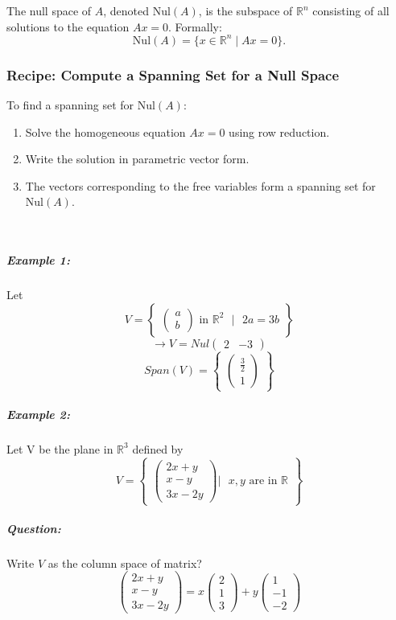 \documentclass[a4paper,12pt]{article}
\begin{document}
\begin{tcolorbox}[title=Definition (Null Space),colframe=blue!70!black, colback=blue!5!white]
The null space of \( A \), denoted \( \text{Nul}(A) \), is the subspace of \( \mathbb{R}^n \) consisting of all solutions to the equation \( A x = 0 \). Formally:
\[
\text{Nul}(A) = \{ x \in \mathbb{R}^n \mid A x = 0 \}.
\]
\end{tcolorbox}

\subsubsection{Recipe: Compute a Spanning Set for a Null Space}
To find a spanning set for \( \text{Nul}(A) \):
\begin{enumerate}
    \item Solve the homogeneous equation \( A x = 0 \) using row reduction.
    \item Write the solution in parametric vector form.
    \item The vectors corresponding to the free variables form a spanning set for \( \text{Nul}(A) \).
\end{enumerate}\\

\subparagraph{Example 1:} Let
\[
V = \begin{Bmatrix}
\begin{pmatrix}
    a\\b
\end{pmatrix} \text{ in \(\mathbb{R}^2\) } | \text{ \(2a = 3b\)}
\end{Bmatrix}
\]
\[
\rightarrow V = Nul\begin{pmatrix}
    2 & -3
\end{pmatrix}
\]
\[
Span(V) = \begin{Bmatrix}
    \begin{pmatrix}
        \frac{3}{2}\\1
    \end{pmatrix}
\end{Bmatrix}
\]
\subparagraph{Example 2:} Let V be the plane in \(\mathbb{R}^3\) defined by
\[
V =
\begin{Bmatrix}
\begin{pmatrix}
    2x + y \\
    x - y \\
    3x - 2y
\end{pmatrix} | \text{ $x,y$ are in \(\mathbb{R}\)}
\end{Bmatrix}
\]
\subparagraph{Question:}Write $V$ as the column space of matrix?
\[
\begin{pmatrix}
    2x + y \\
    x - y \\
    3x - 2y
\end{pmatrix}
= x \begin{pmatrix}
    2\\1\\3
\end{pmatrix}
+ y \begin{pmatrix}
    1\\-1\\-2
\end{pmatrix}
\]
\end{document}

